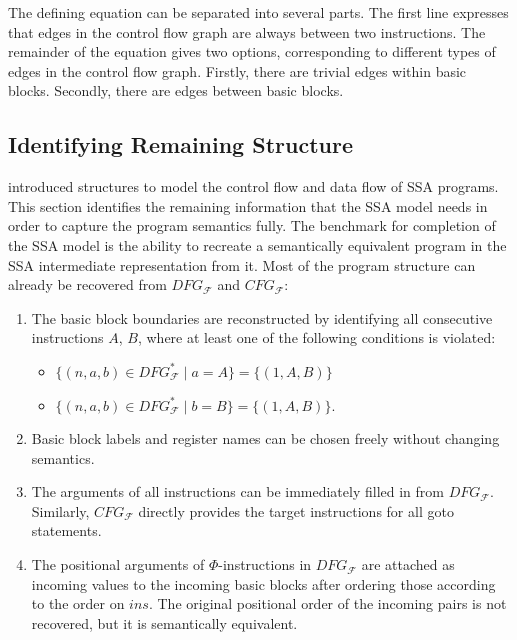     The defining equation can be separated into several parts.
    The first line expresses that edges in the control flow graph are always
    between two instructions.
    The remainder of the equation gives two options, corresponding to different
    types of edges in the control flow graph.
    Firstly, there are trivial edges within basic blocks.
    Secondly, there are edges between basic blocks.


\subsection{Identifying Remaining Structure}
\label{sec:remainingstructure}

     introduced structures to model the control flow
    and data flow of SSA programs.
    This section identifies the remaining information that the SSA model needs
    in order to capture the program semantics fully.
    The benchmark for completion of the SSA model is the ability to recreate a
    semantically equivalent program in the SSA intermediate representation from
    it.
    Most of the program structure can already be recovered from $DFG_\mathcal F$
    and $CFG_\mathcal F$:

\begin{enumerate}
    \item The basic block boundaries are reconstructed by identifying all
          consecutive instructions $A$, $B$, where at least one of the following
          conditions is violated:
    \begin{itemize}
        \item $\{(n,a,b)\in DFG_\mathcal F^*\mid a=A\}=\{(1,A,B)\}$
        \item $\{(n,a,b)\in DFG_\mathcal F^*\mid b=B\}=\{(1,A,B)\}$.
    \end{itemize}
    \item Basic block labels and register names can be chosen freely
          without changing semantics.
    \item The arguments of all instructions can be immediately filled in from 
          $DFG_\mathcal F$.
          Similarly, $CFG_\mathcal F$ directly provides the target instructions
          for all goto statements.
    \item The positional arguments of $\Phi$-instructions in $DFG_\mathcal F$
          are attached as incoming values to the incoming basic blocks
          after ordering those according to the order on $ins$.
          The original positional order of the incoming pairs is
          not recovered, but it is semantically equivalent.
\end{enumerate}

